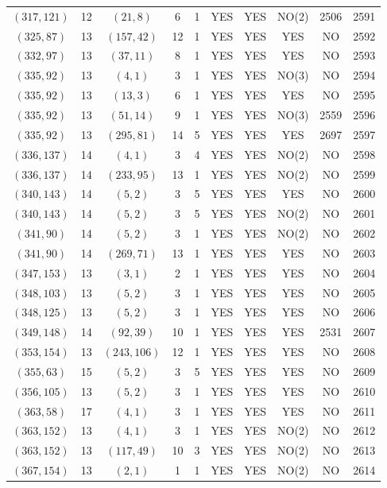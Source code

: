 \begin{longtable}{|c|c|c|c|c|c|c|c|c|c|}
$(317, 121)$ & 12 & $(21, 8)$ & 6 & 1 & YES & YES & NO(2) & 2506 & 2591\\
$(325, 87)$ & 13 & $(157, 42)$ & 12 & 1 & YES & YES & YES & NO & 2592\\
$(332, 97)$ & 13 & $(37, 11)$ & 8 & 1 & YES & YES & YES & NO & 2593\\
$(335, 92)$ & 13 & $(4, 1)$ & 3 & 1 & YES & YES & NO(3) & NO & 2594\\
$(335, 92)$ & 13 & $(13, 3)$ & 6 & 1 & YES & YES & YES & NO & 2595\\
$(335, 92)$ & 13 & $(51, 14)$ & 9 & 1 & YES & YES & NO(3) & 2559 & 2596\\
$(335, 92)$ & 13 & $(295, 81)$ & 14 & 5 & YES & YES & YES & 2697 & 2597\\
$(336, 137)$ & 14 & $(4, 1)$ & 3 & 4 & YES & YES & NO(2) & NO & 2598\\
$(336, 137)$ & 14 & $(233, 95)$ & 13 & 1 & YES & YES & NO(2) & NO & 2599\\
$(340, 143)$ & 14 & $(5, 2)$ & 3 & 5 & YES & YES & YES & NO & 2600\\
$(340, 143)$ & 14 & $(5, 2)$ & 3 & 5 & YES & YES & NO(2) & NO & 2601\\
$(341, 90)$ & 14 & $(5, 2)$ & 3 & 1 & YES & YES & NO(2) & NO & 2602\\
$(341, 90)$ & 14 & $(269, 71)$ & 13 & 1 & YES & YES & YES & NO & 2603\\
$(347, 153)$ & 13 & $(3, 1)$ & 2 & 1 & YES & YES & YES & NO & 2604\\
$(348, 103)$ & 13 & $(5, 2)$ & 3 & 1 & YES & YES & YES & NO & 2605\\
$(348, 125)$ & 13 & $(5, 2)$ & 3 & 1 & YES & YES & YES & NO & 2606\\
$(349, 148)$ & 14 & $(92, 39)$ & 10 & 1 & YES & YES & YES & 2531 & 2607\\
$(353, 154)$ & 13 & $(243, 106)$ & 12 & 1 & YES & YES & YES & NO & 2608\\
$(355, 63)$ & 15 & $(5, 2)$ & 3 & 5 & YES & YES & YES & NO & 2609\\
$(356, 105)$ & 13 & $(5, 2)$ & 3 & 1 & YES & YES & YES & NO & 2610\\
$(363, 58)$ & 17 & $(4, 1)$ & 3 & 1 & YES & YES & YES & NO & 2611\\
$(363, 152)$ & 13 & $(4, 1)$ & 3 & 1 & YES & YES & NO(2) & NO & 2612\\
$(363, 152)$ & 13 & $(117, 49)$ & 10 & 3 & YES & YES & NO(2) & NO & 2613\\
$(367, 154)$ & 13 & $(2, 1)$ & 1 & 1 & YES & YES & NO(2) & NO & 2614\\

\end{longtable}
